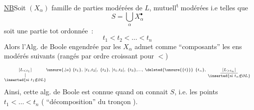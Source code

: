 \uline{NB}\qquad Soit $(X_\alpha)$ famille  de parties modérées de $L$,  mutuell\textsuperscript{t} modérées i.e telles que
\[
S=\bigcup_\alpha X_\alpha^{\bullet}
\]
soit une partie tot ordonnée~:
\[
t_1<t_2<\ldots<t_n
\]
Alors l'Alg. de Boole engendrée par les $X_\alpha$  admet comme   ``composants'' les ens modérés  suivants (rangés par ordre croissant pour $<$)
\[
\scriptstyle
\underset{\substack{\vert\\\inserted{\text{si }t_1\notin\partial L}}}{[L_{<t_1}]}\unsure{,|a}\;
\{t_1\},\ ]t_1,t_2[,\ \{t_2\},\ ]t_{1},t_3[,\ \{t_3\},\ldots,\
\deleted{\unsure{\{t\}}}\ \{t_n\},\
\underset{\substack{\rule{3em}{0.35pt}\\\inserted{\text{si }t_n\notin\partial L}}}{[L_{>t_n}]}
\]
Ainsi, cette alg. de Boole est connue quand on connait $S$, i.e. les points $t_1<\ldots<t_n$ ( ``décomposition''  du tronçon ).

